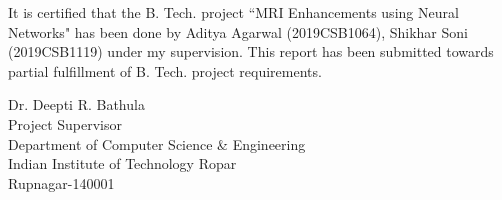 


\begin{certificate}      %

It is certified that the B. Tech. project ``MRI Enhancements using Neural Networks" has been done by Aditya Agarwal (2019CSB1064), Shikhar Soni (2019CSB1119) under my supervision. 
This report has been submitted towards partial fulfillment of B. Tech. project requirements. \\

\vspace*{20mm}

\begin{flushright}
Dr. Deepti R. Bathula \\ Project Supervisor \\ Department of Computer Science \& Engineering \\ Indian Institute of Technology Ropar \\ Rupnagar-140001
\end{flushright}


\end{certificate}



